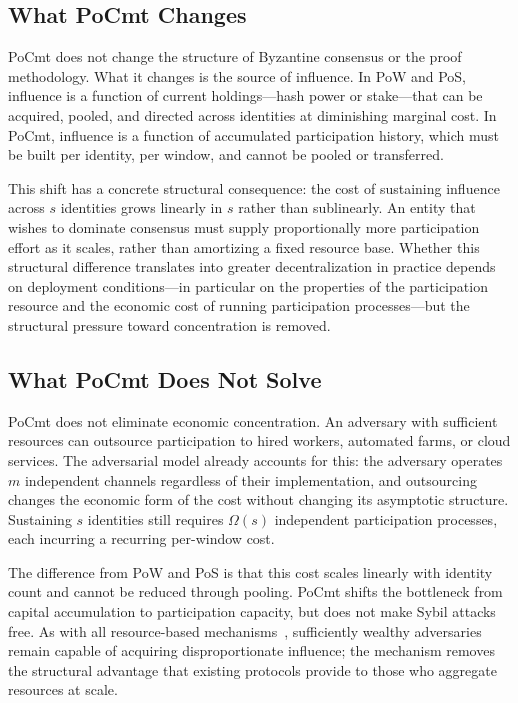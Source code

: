 \documentclass[10pt,journal,twoside]{IEEEtran}
\theoremstyle{remark}
\begin{document}
	\subsection{What PoCmt Changes}
	\label{ssec:disc-changes}
	
	PoCmt does not change the structure of Byzantine consensus
	or the proof methodology.
	What it changes is the source of influence.
	In PoW and PoS, influence is a function of current
	holdings---hash power or stake---that can be acquired,
	pooled, and directed across identities at diminishing
	marginal cost.
	In PoCmt, influence is a function of accumulated
	participation history, which must be built per identity,
	per window, and cannot be pooled or transferred.
	
	This shift has a concrete structural consequence: the cost
	of sustaining influence across $s$ identities grows
	linearly in $s$ rather than sublinearly.
	An entity that wishes to dominate consensus must supply
	proportionally more participation effort as it scales,
	rather than amortizing a fixed resource base.
	Whether this structural difference translates into greater
	decentralization in practice depends on deployment
	conditions---in particular on the properties of the
	participation resource and the economic cost of running
	participation processes---but the structural pressure
	toward concentration is removed.
	
	\subsection{What PoCmt Does Not Solve}
	\label{ssec:disc-limits-econ}
	
	PoCmt does not eliminate economic concentration.
	An adversary with sufficient resources can outsource
	participation to hired workers, automated farms, or
	cloud services.
	The adversarial model already accounts for this: the
	adversary operates $m$ independent channels regardless
	of their implementation, and outsourcing changes the
	economic form of the cost without changing its asymptotic
	structure.
	Sustaining $s$ identities still requires $\Omega(s)$
	independent participation processes, each incurring a
	recurring per-window cost.
	
	The difference from PoW and PoS is that this cost scales
	linearly with identity count and cannot be reduced through
	pooling.
	PoCmt shifts the bottleneck from capital accumulation to
	participation capacity, but does not make Sybil attacks
	free.
	As with all resource-based mechanisms~\cite{bonneau2015sok},
	sufficiently wealthy adversaries remain capable of
	acquiring disproportionate influence; the mechanism
	removes the structural advantage that existing protocols
	provide to those who aggregate resources at scale.
	
\end{document}
